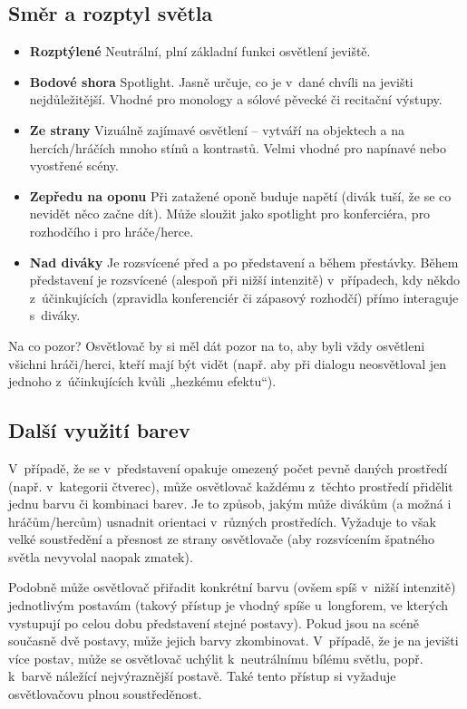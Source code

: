  
\subsection{ Směr a rozptyl světla } \begin{itemize}
\item 	\textbf{Rozptýlené}  Neutrální, plní základní funkci osvětlení jeviště.
\item 	\textbf{Bodové shora} 	Spotlight. Jasně určuje, co je v~dané chvíli na jevišti nejdůležitější. Vhodné pro monology a sólové pěvecké či recitační výstupy.
\item 	\textbf{Ze strany} Vizuálně zajímavé osvětlení – vytváří na objektech a na hercích/hráčích mnoho stínů a kontrastů. Velmi vhodné pro napínavé nebo vyostřené scény.
\item 	\textbf{Zepředu na oponu} 	Při zatažené oponě buduje napětí (divák tuší, že se co nevidět něco začne dít). Může sloužit jako spotlight pro konferciéra, pro rozhodčího i pro hráče/herce.
\item 	\textbf{Nad diváky} 	Je rozsvícené před a po představení a během přestávky. Během představení je rozsvícené (alespoň při nižší intenzitě) v~případech, kdy někdo z~účinkujících (zpravidla konferenciér či zápasový rozhodčí) přímo interaguje s~diváky.
\end{itemize}
 
Na co pozor? 
Osvětlovač by si měl dát pozor na to, aby byli vždy osvětleni všichni hráči/herci, kteří mají být vidět (např. aby při dialogu neosvětloval jen jednoho z~účinkujících kvůli „hezkému efektu“). 
 
\subsection{Další využití barev}  
V~případě, že se v~představení opakuje omezený počet pevně daných prostředí (např. v~kategorii čtverec), může osvětlovač každému z~těchto prostředí přidělit jednu barvu či kombinaci barev. Je to způsob, jakým může divákům (a možná i hráčům/hercům) usnadnit orientaci v~různých prostředích. Vyžaduje to však velké soustředění a přesnost ze strany osvětlovače (aby rozsvícením špatného světla nevyvolal naopak zmatek). 
 
Podobně může osvětlovač přiřadit konkrétní barvu (ovšem spíš v~nižší intenzitě)  jednotlivým postavám (takový přístup je vhodný spíše u~longforem, ve kterých vystupují po celou dobu představení stejné postavy). Pokud jsou na scéně současně dvě postavy, může jejich barvy zkombinovat. V~případě, že je na jevišti více postav, může se osvětlovač uchýlit k~neutrálnímu bílému světlu, popř. k~barvě náležící nejvýraznější postavě. Také tento přístup si vyžaduje osvětlovačovu plnou soustředěnost. 
 
